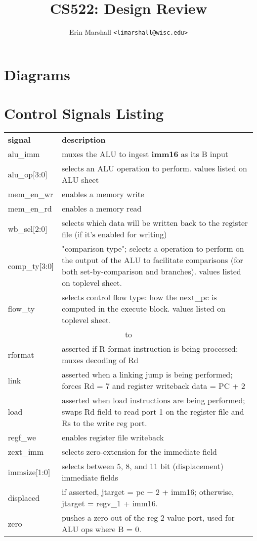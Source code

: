 \documentclass{article}
\title{CS522: Design Review}
\author{Erin Marshall \texttt{<limarshall@wisc.edu>}}
\begin{document}
\maketitle

\section{Diagrams}






\def\headline#1{\hbox to \hsize{\hrulefill\quad\lower.3em\hbox{#1}\quad\hrulefill}}

\section{Control Signals Listing}
\begin{tabular}{lp{}}
	\textbf{signal} & \textbf{description} \\
	alu\_imm & muxes the ALU to ingest \textbf{imm16} as its B input\\
	alu\_op[3:0] & selects an ALU operation to perform. values listed on ALU sheet\\
	mem\_en\_wr & enables a memory write\\
	mem\_en\_rd & enables a memory read\\
	wb\_sel[2:0] & selects which data will be written back to the register file (if it's enabled for writing) \\
	comp\_ty[3:0] & "comparison type"; selects a operation to perform on the output of the ALU to facilitate comparisons (for both set-by-comparison and branches). values listed on toplevel sheet. \\
	flow\_ty & selects control flow type: how the next\_pc is computed in the execute block. values listed on toplevel sheet. \\
	\multicolumn{2}{c}{\headline{\textbf{decode}-block internal control signals}}\\
	rformat & asserted if R-format instruction is being processed; muxes decoding of Rd \\
	link & asserted when a linking jump is being performed; forces Rd = 7 and register writeback data = PC + 2 \\
	load & asserted when load instructions are being performed; swaps Rd field to read port 1 on the register file and Rs to the write reg port. \\
	regf\_we & enables register file writeback \\
	zext\_imm & selects zero-extension for the immediate field \\
	immsize[1:0] & selects between 5, 8, and 11 bit (displacement) immediate fields \\
	displaced & if asserted, jtarget = pc + 2 + imm16; otherwise, jtarget = regv\_1 + imm16. \\
	zero & pushes a zero out of the reg 2 value port, used for ALU ops where B = 0. \\
\end{tabular}
\end{document}
